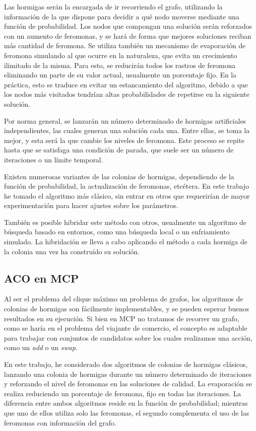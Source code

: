 Las hormigas serán la encargada de ir recorriendo el grafo, utilizando la información
de la que dispone para decidir a qué nodo moverse mediante una función de probabilidad.
Los nodos que compongan una solución serán reforzados con un aumento de feromonas, y
se hará de forma que mejores soluciones reciban más cantidad de feromona.
Se utiliza también un mecanismo de evaporación de feromona simulando al que ocurre en
la naturaleza, que evita un crecimiento ilimitado de la misma. Para esto, se reducirán
todos los rastros de feromona eliminando un parte de su valor actual, usualmente un
porcentaje fijo. En la práctica, esto se traduce en evitar un estancamiento del algoritmo,
debido a que los nodos más visitados tendrían altas probabilidades de repetirse en la
siguiente solución.

Por norma general, se lanzarán un número determinado de hormigas artificiales independientes,
las cuales generan una solución cada una. Entre ellas, se toma la mejor, y esta será la
que cambie los niveles de feromona. Este proceso se repite hasta que se satisfaga una
condición de parada, que suele ser un número de iteraciones o un límite temporal.

Existen numerosas variantes de las colonias de hormigas, dependiendo de la función de
probabilidad, la actualización de feromonas, etcétera. En este trabajo he tomado el
algoritmo más clásico, sin entrar en otros que requerirían de mayor experimentación
para hacer ajustes sobre los parámetros.

También es posible hibridar este método con otros, usualmente un algoritmo de búsqueda
basado en entornos, como una búsqueda local o un enfriamiento simulado. La hibridación
se lleva a cabo aplicando el método a cada hormiga de la colonia una vez ha construído su solución.

\subsection{ACO en MCP}

Al ser el problema del clique máximo un problema de grafos, los algoritmos de colonias
de hormigas son fácilmente implementables, y se pueden esperar buenos resultados en su
ejecución. Si bien en MCP no tratamos de recorrer un grafo, como se haría en el problema
del viajante de comercio, el concepto es adaptable para trabajar con conjuntos de candidatos
sobre los cuales realizamos una acción, como un \textit{add} o un \textit{swap}.

En este trabajo, he considerado dos algoritmos de colonias de hormigas clásicos,
lanzando una colonia de hormigas durante un número determinado de iteraciones y
reforzando el nivel de feromonas en las soluciones de calidad. La evaporación se
realiza reduciendo un porcentaje de feromona, fijo en todas las iteraciones.
La diferencia entre ambos algoritmos reside en la función de probabilidad;
mientras que uno de ellos utiliza solo las feromonas, el segundo complementa
el uso de las feromonas con información del grafo.

